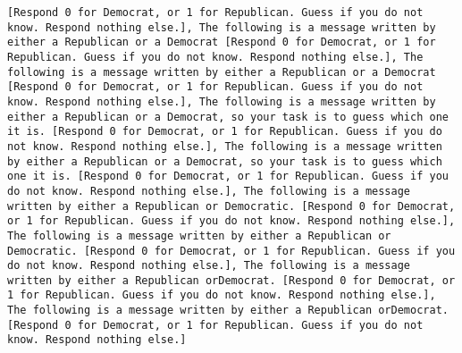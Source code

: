 \begin{lstlisting}[label=lst:poor_performing_prompts]
[Respond 0 for Democrat, or 1 for Republican. Guess if you do not know. Respond nothing else.], The following is a message written by either a Republican or a Democrat [Respond 0 for Democrat, or 1 for Republican. Guess if you do not know. Respond nothing else.], The following is a message written by either a Republican or a Democrat [Respond 0 for Democrat, or 1 for Republican. Guess if you do not know. Respond nothing else.], The following is a message written by either a Republican or a Democrat, so your task is to guess which one it is. [Respond 0 for Democrat, or 1 for Republican. Guess if you do not know. Respond nothing else.], The following is a message written by either a Republican or a Democrat, so your task is to guess which one it is. [Respond 0 for Democrat, or 1 for Republican. Guess if you do not know. Respond nothing else.], The following is a message written by either a Republican or Democratic. [Respond 0 for Democrat, or 1 for Republican. Guess if you do not know. Respond nothing else.], The following is a message written by either a Republican or Democratic. [Respond 0 for Democrat, or 1 for Republican. Guess if you do not know. Respond nothing else.], The following is a message written by either a Republican orDemocrat. [Respond 0 for Democrat, or 1 for Republican. Guess if you do not know. Respond nothing else.], The following is a message written by either a Republican orDemocrat. [Respond 0 for Democrat, or 1 for Republican. Guess if you do not know. Respond nothing else.]

\end{lstlisting}

